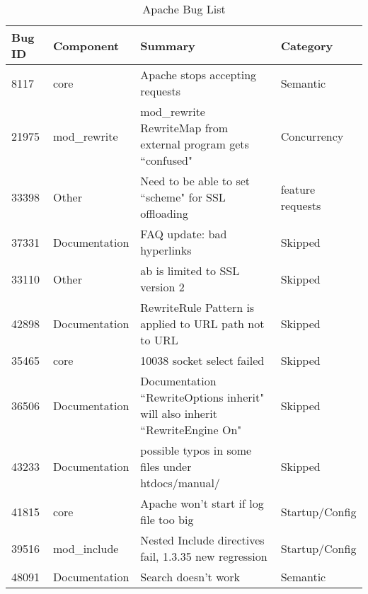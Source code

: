 \begin{longtable}[c]{p{1cm}p{3cm}p{6cm}p{4cm}}
\caption{Apache Bug List}
\label{tab:apachebuglist}\\
Bug ID & Component & Summary & Category          \\
\endfirsthead
%
\endhead
%

8117   & core               & Apache stops accepting requests                                                                                & Semantic          \\
21975  & mod\_rewrite       & mod\_rewrite RewriteMap from external program gets ``confused"                                                  & Concurrency       \\
33398  & Other              & Need to be able to set ``scheme" for SSL offloading                                                             & feature requests  \\
37331  & Documentation      & FAQ update: bad hyperlinks                                                                                     & Skipped           \\
33110  & Other              & ab is limited to SSL version 2                                                                                 & Skipped           \\
42898  & Documentation      & RewriteRule Pattern  is applied to URL path not to URL                                                         & Skipped           \\
35465  & core               & 10038 socket select failed                                                                                     & Skipped           \\
36506  & Documentation      & Documentation ``RewriteOptions inherit" will also inherit ``RewriteEngine On"   & Skipped           \\
43233  & Documentation      & possible typos in some files under htdocs/manual/                                                              & Skipped           \\
41815  & core               & Apache won't start if log file too big                                                                         & Startup/Config    \\
39516  & mod\_include       & Nested Include directives fail, 1.3.35 new regression                                                          & Startup/Config    \\
48091  & Documentation      & Search doesn't work                                                                                            & Semantic          \\

\end{longtable}

